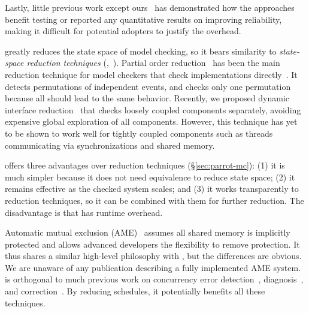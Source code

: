 Lastly, little previous work except ours~\cite{wu:pldi12} has demonstrated how the
approaches benefit testing or reported any quantitative results on
improving reliability, making it difficult for potential adopters to
justify the overhead.

 \parrot greatly reduces the state space of
model checking, so it bears similarity to \emph{state-space reduction
  techniques} (\eg,~\cite{godefroid:verisoft, flanagan:dynamicpo,
  demeter:sosp11}).  Partial order
reduction~\cite{godefroid:verisoft, flanagan:dynamicpo} has been the main
reduction technique for model checkers that check implementations
directly~\cite{modist:nsdi09, dbug:spin11}.  It detects
permutations of independent events, and checks only one permutation
because all should lead to the same behavior.  Recently, we proposed
dynamic interface reduction~\cite{demeter:sosp11} that checks loosely
coupled components separately, avoiding expensive global exploration of
all components.  However, this technique has yet to be shown to work well
for tightly coupled components such as threads communicating
via synchronizations and shared memory.

\parrot offers three advantages over reduction techniques
(\S\ref{sec:parrot-mc}): (1) it is much simpler because it does not
need equivalence to reduce state space; (2) it remains effective as the
checked system scales; and (3) it works transparently to reduction
techniques, so it can be combined with them for further reduction.  The
disadvantage is that \parrot has runtime overhead.

 Automatic mutual exclusion (AME)~\cite{ame:hotos07} assumes all shared
memory is implicitly protected and allows advanced developers the
flexibility to remove protection.  It thus shares a similar high-level
philosophy with \parrot, but the differences are obvious.  We are unaware of
any publication describing a fully implemented AME system. \parrot is
orthogonal to much previous work on concurrency error
detection~\cite{yu:racetrack:sosp,savage:eraser,racerx:sosp03,lu:muvi:sosp,avio:asplos06,conmem:asplos10},
diagnosis~\cite{racefuzzer:pldi08,ctrigger:asplos09,atomfuzzer:fse08}, and
correction~\cite{dimmunix:osdi08,gadara:osdi08,wu:loom:osdi10,cfix:osdi12}. By
reducing schedules, it potentially benefits all these techniques.
